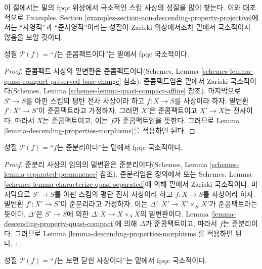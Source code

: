 \noindent
이 절에서는 밑의 fpqc 위상에서 국소적인 스킴 사상의 성질을 많이 찾는다.
이와 대조적으로 Examples, Section
\ref{examples-section-non-descending-property-projective}에서는
“사영적”과 “준사영적”이라는 성질이 Zariski 위상에서조차 밑에서
국소적이지 않음을 보일 것이다.

\begin{lemma}
\label{lemma-descending-property-quasi-compact}
성질 $\mathcal{P}(f) =$“$f$는 준콤팩트이다”는 밑에서 fpqc 국소적이다.
\end{lemma}

\begin{proof}
준콤팩트 사상의 밑변환은 준콤팩트이다(Schemes, Lemma
\ref{schemes-lemma-quasi-compact-preserved-base-change} 참조).
준콤팩트임은 밑에서 Zariski 국소적이다(Schemes, Lemma
\ref{schemes-lemma-quasi-compact-affine} 참조). 마지막으로
$S' \to S$를 아핀 스킴의 평탄 전사 사상이라 하고 $f : X \to S$를
사상이라 하자. 밑변환 $f' : X' \to S'$이 준콤팩트라고 가정하자. 그러면
$X'$은 준콤팩트이고 $X' \to X$는 전사이다. 따라서 $X$는 준콤팩트이고,
이는 $f$가 준콤팩트임을 뜻한다. 그러므로 Lemma
\ref{lemma-descending-properties-morphisms}를 적용하면 된다.
\end{proof}

\begin{lemma}
\label{lemma-descending-property-quasi-separated}
성질 $\mathcal{P}(f) =$“$f$는 준분리이다”는 밑에서 fpqc 국소적이다.
\end{lemma}

\begin{proof}
준분리 사상의 임의의 밑변환은 준분리이다(Schemes, Lemma
\ref{schemes-lemma-separated-permanence} 참조). 준분리임은 정의에서
또는 Schemes, Lemma
\ref{schemes-lemma-characterize-quasi-separated}에 의해 밑에서 Zariski
국소적이다. 마지막으로 $S' \to S$를 아핀 스킴의 평탄 전사 사상이라
하고 $f : X \to S$를 사상이라 하자. 밑변환 $f' : X' \to S'$이
준분리라고 가정하자. 이는 $\Delta' : X' \to X'\times_{S'} X'$가
준콤팩트라는 뜻이다. $\Delta'$은 $S' \to S$에 의한
$\Delta : X \to X \times_S X$의 밑변환이다. Lemma
\ref{lemma-descending-property-quasi-compact}에 의해 $\Delta$가
준콤팩트이고, 따라서 $f$는 준분리이다. 그러므로 Lemma
\ref{lemma-descending-properties-morphisms}를 적용하면 된다.
\end{proof}

\begin{lemma}
\label{lemma-descending-property-universally-closed}
성질 $\mathcal{P}(f) =$“$f$는 보편 닫힌 사상이다”는 밑에서 fpqc
국소적이다.
\end{lemma}

